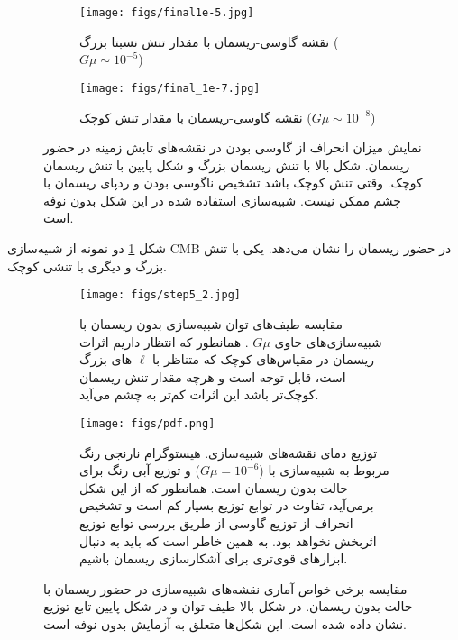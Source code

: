 \begin{figure}[h!]
	\centering
	\begin{subfigure}{\textwidth}
		\centering
		\texttt{[image: figs/final1e-5.jpg]}
		\caption{نقشه گاوسی-ریسمان با مقدار تنش نسبتا بزرگ
			($G\mu \sim 10^{-5}$)}
	\end{subfigure}%

	\begin{subfigure}{\textwidth}
		\centering
		\texttt{[image: figs/final\_1e-7.jpg]}
		\caption{ نقشه گاوسی-ریسمان با مقدار تنش کوچک
		($G\mu \sim 10^{-8}$) }
	\end{subfigure}
	
	\caption{نمایش میزان انحراف از گاوسی بودن در نقشه‌های تابش زمینه در حضور ریسمان. شکل بالا با تنش ریسمان بزرگ و شکل پایین با تنش ریسمان کوچک. وقتی تنش کوچک باشد تشخیص ناگوسی بودن و ردپای ریسمان با چشم ممکن نیست.  شبیه‌سازی استفاده شده در این شکل 
		بدون نوفه است. }
	\label{fig:tot}
\end{figure}
 شکل 
\ref{fig:tot}
دو نمونه از شبیه‌سازی CMB در حضور ریسمان را نشان می‌دهد. یکی با تنش بزرگ و دیگری با تنشی کوچک.
\begin{figure}[h!]
	\centering
	\begin{subfigure}{\textwidth}
		\centering
		\texttt{[image: figs/step5\_2.jpg]}
		\caption{مقایسه طیف‌های توان شبیه‌سازی بدون ریسمان با شبیه‌سازی‌های حاوی  
			$G\mu$
		. همانطور که انتظار داریم اثرات ریسمان در مقیاس‌های کوچک که متناظر با 
	$\ell$
‌های بزرگ است، قابل توجه است و هرچه مقدار تنش ریسمان کوچک‌تر باشد این اثرات کم‌تر به چشم می‌آید.}
	\end{subfigure}%

	\begin{subfigure}{\textwidth}
		\centering
		\texttt{[image: figs/pdf.png]}
		\caption{ توزیع دمای نقشه‌های شبیه‌سازی. هیستوگرام نارنجی رنگ مربوط به شبیه‌سازی با 
			($G\mu = 10^{-6}$) 
		و توزیع آبی رنگ برای حالت بدون ریسمان است. همانطور که از این شکل برمی‌آید، تفاوت در توابع توزیع بسیار کم است و تشخیص انحراف از توزیع گاوسی از طریق بررسی توابع توزیع اثربخش نخواهد بود. به همین خاطر است که باید به دنبال ابزارهای قوی‌تری برای آشکارسازی ریسمان باشیم.   }
	\end{subfigure}
	
	\caption{مقایسه برخی خواص آماری نقشه‌های شبیه‌سازی در حضور ریسمان با حالت بدون ریسمان.  در شکل بالا طیف توان و در شکل پایین تابع توزیع نشان داده شده است.
	این شکل‌ها متعلق به آزمایش
بدون نوفه است. }
	\label{fig:stat_comparison}
\end{figure}